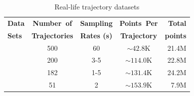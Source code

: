 \begin{table}
	\vspace{-1ex}
	\caption{\small Real-life trajectory datasets}
	\centering
	\small
	\begin{tabular}{|l|c|c|c|r|}
		\hline
		\bf{Data}& \bf{Number\ of}     &\bf{Sampling}   &\bf{Points~Per}    &\bf{Total} \\
		\bf{Sets} & \bf{Trajectories}   &\bf{Rates (s)}  &\bf{Trajectory}&\bf{points}\\	\hline
		\taxi	&{500}	    &60	        &{$\sim42.8$K}      &{21.4M} \\	\hline
		\ucar	&200	    &3-5	&$\sim114.0$K   &22.8M 	\\	\hline
		\geolife &182	    &1-5	&$\sim131.4$K   &24.2M	\\	\hline
		\mopsi   &51	    	&2	    &$\sim153.9$K   &7.9M	\\	\hline
	\end{tabular}
	\label{tab:datasets}
	\vspace{-3ex}
\end{table}





